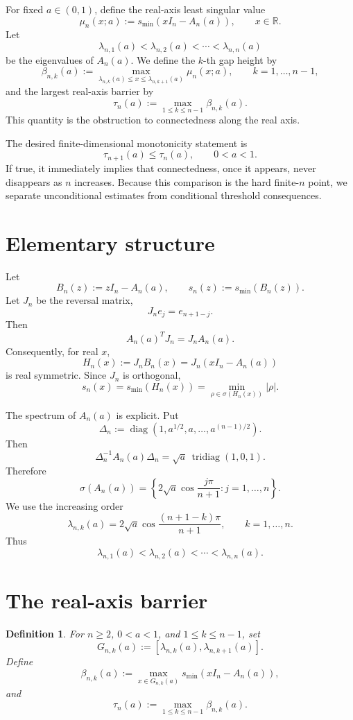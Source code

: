 \documentclass[11pt]{amsart}
\numberwithin{equation}{section}
\DeclareMathOperator{\tridiag}{tridiag}
\DeclareMathOperator{\diag}{diag}
\newcommand{\R}{\mathbb R}
\newtheorem{definition}[theorem]{Definition}
\begin{document}
For fixed \(a\in(0,1)\), define the real-axis least singular value
\[
\mu_n(x;a):=s_{\min}(xI_n-A_n(a)),
\qquad x\in\R.
\]
Let
\[
\lambda_{n,1}(a)<\lambda_{n,2}(a)<\cdots<\lambda_{n,n}(a)
\]
be the eigenvalues of \(A_n(a)\).  We define the \(k\)-th gap height by
\[
\beta_{n,k}(a)
:=
\max_{\lambda_{n,k}(a)\le x\le\lambda_{n,k+1}(a)}
\mu_n(x;a),
\qquad k=1,\dots,n-1,
\]
and the largest real-axis barrier by
\[
\tau_n(a):=\max_{1\le k\le n-1}\beta_{n,k}(a).
\]
This quantity is the obstruction to connectedness along the real axis.

The desired finite-dimensional monotonicity statement is
\[
\tau_{n+1}(a)\le\tau_n(a),
\qquad 0<a<1.
\]
If true, it immediately implies that connectedness, once it appears, never disappears as \(n\) increases.  Because this comparison is the hard finite-\(n\) point, we separate unconditional estimates from conditional threshold consequences.

\section{Elementary structure}

Let
\[
B_n(z):=zI_n-A_n(a),
\qquad
s_n(z):=s_{\min}(B_n(z)).
\]
Let \(J_n\) be the reversal matrix,
\[
J_ne_j=e_{n+1-j}.
\]
Then
\[
A_n(a)^TJ_n=J_nA_n(a).
\]
Consequently, for real \(x\),
\[
H_n(x):=J_nB_n(x)=J_n(xI_n-A_n(a))
\]
is real symmetric.  Since \(J_n\) is orthogonal,
\begin{equation}\label{eq:real-axis-smin}
s_n(x)
=
s_{\min}(H_n(x))
=
\min_{\rho\in\sigma(H_n(x))}|\rho|.
\end{equation}

The spectrum of \(A_n(a)\) is explicit.  Put
\[
\Delta_n:=\diag(1,a^{1/2},a,\dots,a^{(n-1)/2}).
\]
Then
\[
\Delta_n^{-1}A_n(a)\Delta_n
=
\sqrt a\,\tridiag(1,0,1).
\]
Therefore
\begin{equation}\label{eq:toeplitz-spectrum}
\sigma(A_n(a))
=
\left\{
2\sqrt a\cos\frac{j\pi}{n+1}:j=1,\dots,n
\right\}.
\end{equation}
We use the increasing order
\[
\lambda_{n,k}(a)
=
2\sqrt a\cos\frac{(n+1-k)\pi}{n+1},
\qquad k=1,\dots,n.
\]
Thus
\[
\lambda_{n,1}(a)<\lambda_{n,2}(a)<\cdots<\lambda_{n,n}(a).
\]

\section{The real-axis barrier}

\begin{definition}
For \(n\ge2\), \(0<a<1\), and \(1\le k\le n-1\), set
\[
G_{n,k}(a)
:=
[\lambda_{n,k}(a),\lambda_{n,k+1}(a)].
\]
Define
\[
\beta_{n,k}(a)
:=
\max_{x\in G_{n,k}(a)}
s_{\min}(xI_n-A_n(a)),
\]
and
\[
\tau_n(a)
:=
\max_{1\le k\le n-1}\beta_{n,k}(a).
\]
\end{definition}
\end{document}
